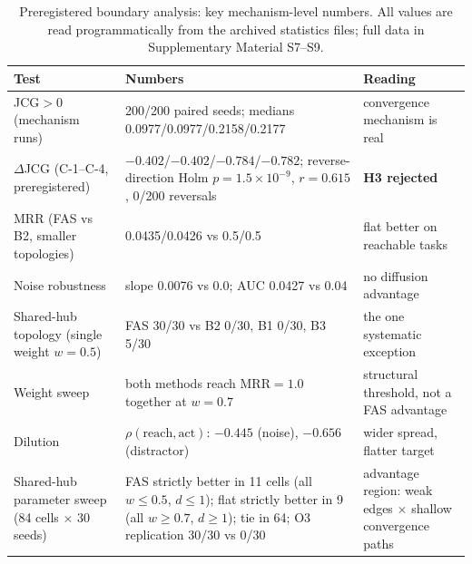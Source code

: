 \documentclass[10pt,a4paper]{article}
\begin{document}
\begin{table}[t]
\centering\small
\caption{Preregistered boundary analysis: key mechanism-level numbers. All values are read programmatically from the archived statistics files; full data in Supplementary Material S7--S9.}
\label{tab:boundary}
\begin{tabular}{L{4.4cm}L{6.6cm}L{3.4cm}}
\toprule
\textbf{Test} & \textbf{Numbers} & \textbf{Reading} \\
\midrule
JCG${>}0$ (mechanism runs) & 200/200 paired seeds; medians 0.0977/0.0977/0.2158/0.2177 & convergence mechanism is real \\
$\Delta$JCG (C-1--C-4, preregistered) & ${-}0.402$/${-}0.402$/${-}0.784$/${-}0.782$; reverse-direction Holm $p{=}1.5\times10^{-9}$, $r{=}0.615$, 0/200 reversals & \textbf{H3 rejected} \\
MRR (FAS vs B2, smaller topologies) & 0.0435/0.0426 vs 0.5/0.5 & flat better on reachable tasks \\
Noise robustness & slope 0.0076 vs 0.0; AUC 0.0427 vs 0.04 & no diffusion advantage \\
Shared-hub topology (single weight $w{=}0.5$) & FAS 30/30 vs B2 0/30, B1 0/30, B3 5/30 & the one systematic exception \\
Weight sweep & both methods reach MRR${=}1.0$ together at $w{=}0.7$ & structural threshold, not a FAS advantage \\
Dilution & $\rho(\mathrm{reach},\mathrm{act})$: $-0.445$ (noise), $-0.656$ (distractor) & wider spread, flatter target \\
Shared-hub parameter sweep (84 cells $\times$ 30 seeds) & FAS strictly better in 11 cells (all $w{\le}0.5$, $d{\le}1$); flat strictly better in 9 (all $w{\ge}0.7$, $d{\ge}1$); tie in 64; O3 replication 30/30 vs 0/30 & advantage region: weak edges $\times$ shallow convergence paths \\
\bottomrule
\end{tabular}
\end{table}
\end{document}
